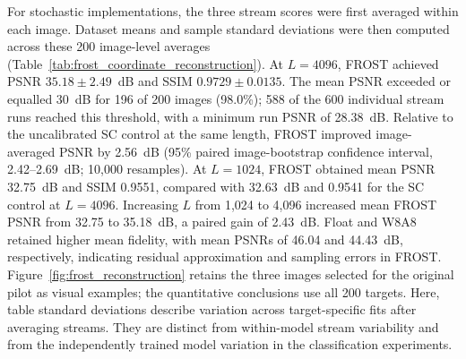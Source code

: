 \documentclass[pdflatex,sn-mathphys-num]{sn-jnl}
\theoremstyle{thmstyleone}
\theoremstyle{thmstyletwo}
\theoremstyle{thmstylethree}
\begin{document}
For stochastic implementations, the three stream scores were first averaged
within each image. Dataset means and sample standard deviations were then
computed across these 200 image-level averages
(Table~\ref{tab:frost_coordinate_reconstruction}). At $L=4096$, FROST
achieved PSNR $35.18\pm2.49$~dB and SSIM
$0.9729\pm0.0135$.
The mean PSNR exceeded or equalled 30~dB for 196 of 200 images
(98.0\%); 588 of the 600 individual stream runs
reached this threshold, with a minimum run PSNR of 28.38~dB.
Relative to the uncalibrated SC control at the same length, FROST improved
image-averaged PSNR by 2.56~dB (95\% paired image-bootstrap confidence
interval, 2.42--2.69~dB; 10,000 resamples).
At $L=1024$, FROST obtained mean PSNR 32.75~dB and SSIM
0.9551, compared with 32.63~dB and 0.9541 for
the SC control at $L=4096$.
Increasing $L$ from 1,024 to 4,096 increased mean FROST PSNR from
32.75 to 35.18~dB, a paired gain of 2.43~dB.
Float and W8A8 retained higher mean fidelity, with mean PSNRs of
46.04 and 44.43~dB, respectively, indicating residual
approximation and sampling errors in FROST.
Figure~\ref{fig:frost_reconstruction} retains the three images selected
for the original pilot as visual examples; the quantitative conclusions
use all 200 targets. Here, table standard deviations describe variation
across target-specific fits after averaging streams. They are distinct
from within-model stream variability and from the independently trained
model variation in the classification experiments.
\end{document}
